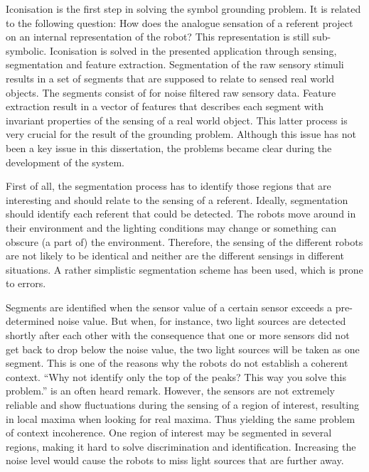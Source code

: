 Iconisation is the first step in solving the symbol grounding problem. It is related to the following question: How does the analogue sensation of a referent project on an internal representation of the robot? This representation is still sub-symbolic. Iconisation is solved in the presented application through sensing, segmentation and feature extraction. Segmentation of the raw sensory stimuli results in a set of segments that are supposed to relate to sensed real world objects. The segments consist of for noise filtered raw sensory data. Feature extraction result in a vector of features that describes each segment with invariant properties of the sensing of a real world object. This latter process is very crucial for the result of the grounding problem. Although this issue has not been a key issue in this dissertation, the problems became clear during the development of the system. 

First of all, the segmentation process has to identify those regions that are interesting and should relate to the sensing of a referent. Ideally, segmentation should identify each referent that could be detected. The robots move around in their environment and the lighting conditions may change or something can obscure (a part of) the environment. Therefore, the sensing of the different robots are not likely to be identical and neither are the different sensings in different situations. A rather simplistic segmentation scheme has been used, which is prone to errors. 

Segments are identified when the sensor value of a certain sensor exceeds a pre-determined noise value. But when, for instance, two light sources are detected shortly after each other with the consequence that one or more sensors did not get back to drop below the noise value, the two light sources will be taken as one segment. This is one of the reasons why the robots do not establish a coherent context. ``Why not identify only the top of the peaks? This way you solve this problem.'' is an often heard remark. However, the sensors are not extremely reliable and show fluctuations during the sensing of a region of interest, resulting in local maxima when looking for real maxima. Thus yielding the same problem of context incoherence. One region of interest may be segmented in several regions, making it hard to solve discrimination and identification. Increasing the noise level would cause the robots to miss light sources that are further away.

